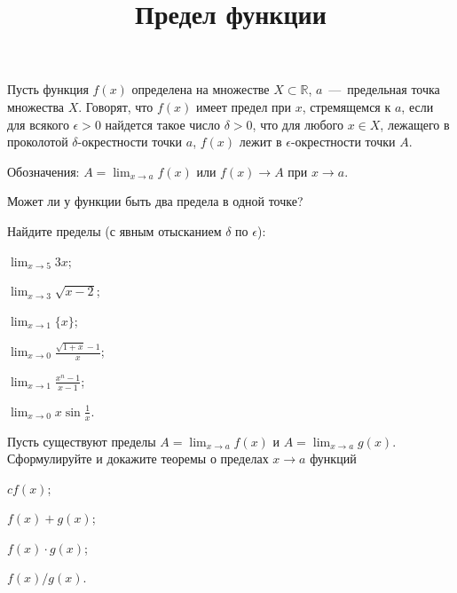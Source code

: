\documentclass[a4paper, 12pt, num=32, date=]{listok}
\begin{document}
\title{Предел функции}
\maketitle{}


\begin{definition}[(по Коши)]
Пусть функция $f(x)$ определена на множестве $X \subset \mathbb{R}$, $a$~---~предельная точка множества $X$. Говорят, что $f(x)$ имеет предел при $x$, стремящемся к $a$, если для всякого $\epsilon > 0$ найдется такое число $\delta > 0$, что для любого $x \in X$, лежащего в проколотой $\delta$-окрестности точки $a$, $f(x)$ лежит в $\epsilon$-окрестности точки $A$.

Обозначения: $\displaystyle A = \lim_{x \to a} f(x)$ или $f(x) \to A$ при $x \to a$.
\end{definition}


\begin{problem}
    Может ли у функции быть два предела в одной точке?
\end{problem}


\begin{problem}
    Найдите пределы (с явным отысканием $\delta$ по $\epsilon$):
    \begin{probparts}
        \item $\displaystyle \lim_{x \to 5} 3x$;
        \item $\displaystyle \lim_{x \to 3} \sqrt{x - 2}$;
        \item $\displaystyle \lim_{x \to 1} \{x\}$;
        \item $\displaystyle \lim_{x \to 0} \frac{\sqrt{1 + x} - 1}{x}$;
        \item $\displaystyle \lim_{x \to 1} \frac{x^n - 1}{x - 1}$;
        \item $\displaystyle \lim_{x \to 0} x \sin \frac{1}{x}$.
    \end{probparts}
\end{problem}

\begin{problem}
    Пусть существуют пределы $\displaystyle A = \lim_{x \to a} f(x)$ и $\displaystyle A = \lim_{x \to a} g(x)$. Сформулируйте и докажите теоремы о пределах $x \to a$ функций
    \begin{probparts}
        \item $cf(x)$;
        \item $f(x) + g(x)$;
        \item $f(x) \cdot g(x)$;
        \item $f(x) / g(x)$.
    \end{probparts}
\end{problem}
\end{document}

